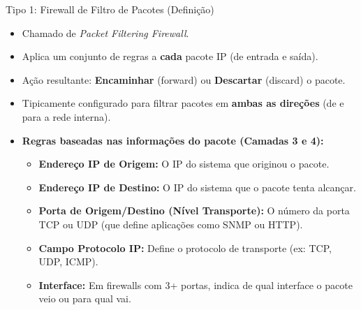 \begin{frame}{Tipo 1: Firewall de Filtro de Pacotes (Definição)}
    \begin{itemize}
        \item Chamado de \textit{Packet Filtering Firewall}.
        \item Aplica um conjunto de regras a \textbf{cada} pacote IP (de entrada e saída).
        \item Ação resultante: \textbf{Encaminhar} (forward) ou \textbf{Descartar} (discard) o pacote.
        \item Tipicamente configurado para filtrar pacotes em \textbf{ambas as direções} (de e para a rede interna).

        \item \textbf{Regras baseadas nas informações do pacote (Camadas 3 e 4):}
              \begin{itemize}
                  \item \textbf{Endereço IP de Origem:} O IP do sistema que originou o pacote.
                  \item \textbf{Endereço IP de Destino:} O IP do sistema que o pacote tenta alcançar.
                  \item \textbf{Porta de Origem/Destino (Nível Transporte):} O número da porta TCP ou UDP (que define aplicações como SNMP ou HTTP).
                  \item \textbf{Campo Protocolo IP:} Define o protocolo de transporte (ex: TCP, UDP, ICMP).
                  \item \textbf{Interface:} Em firewalls com 3+ portas, indica de qual interface o pacote veio ou para qual vai.
              \end{itemize}
    \end{itemize}
\end{frame}

